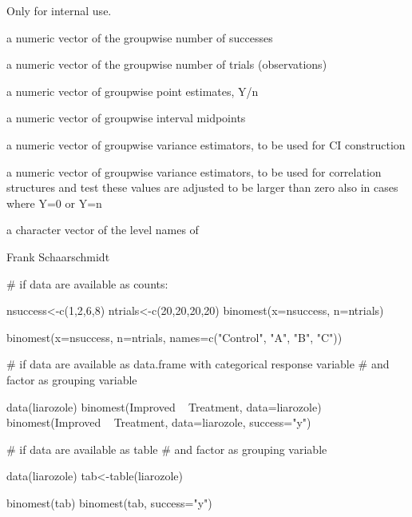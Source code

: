 \begin{Details}\relax
Only for internal use.
\end{Details}
\begin{Value}
\begin{ldescription}
\item[\code{Y}] a numeric vector of the groupwise number of successes
\item[\code{n}] a numeric vector of the groupwise number of trials (observations)
\item[\code{estimate}] a numeric vector of groupwise point estimates, Y/n
\item[\code{estp}] a numeric vector of groupwise interval midpoints
\item[\code{varp}] a numeric vector of groupwise variance estimators, to be used for CI construction
\item[\code{varcor}] a numeric vector of groupwise variance estimators, to be used for correlation structures and test
these values are adjusted to be larger than zero also in cases where Y=0 or Y=n
\item[\code{names}] a character vector of the level names of 
\item[\code{success}] 
\end{ldescription}
\end{Value}
\begin{Author}\relax
Frank Schaarschmidt
\end{Author}
\begin{Examples}
\begin{ExampleCode}

# if data are available as counts:

nsuccess<-c(1,2,6,8)
ntrials<-c(20,20,20,20)
binomest(x=nsuccess, n=ntrials)

binomest(x=nsuccess, n=ntrials, names=c("Control", "A", "B", "C"))

# if data are available as data.frame with categorical response variable
# and factor as grouping variable 

data(liarozole)
binomest(Improved ~ Treatment, data=liarozole)
binomest(Improved ~ Treatment, data=liarozole, success="y")

# if data are available as table
# and factor as grouping variable 

data(liarozole)
tab<-table(liarozole)

binomest(tab)
binomest(tab, success="y")

\end{ExampleCode}
\end{Examples}

